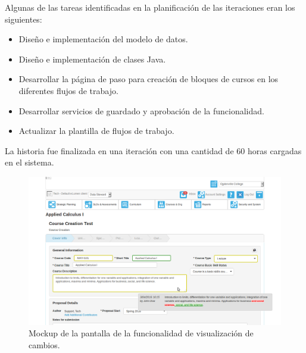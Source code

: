 Algunas de las tareas identificadas en la planificación de las iteraciones eran los siguientes:
\begin{itemize}
	\item Diseño e implementación del modelo de datos.
	\item Diseño e implementación de clases Java.
	\item Desarrollar la página de paso para creación de bloques de cursos en los diferentes flujos de trabajo.
	\item Desarrollar servicios de guardado y aprobación de la funcionalidad.
	\item Actualizar la plantilla de flujos de trabajo.
\end{itemize}

La historia fue finalizada en una iteración con una cantidad de 60 horas cargadas en el sistema.

\begin{figure}[H]
\centering
\includegraphics[width=125mm,scale=1]{Capitulos/DesarrollodelaAplicacion/Imagenes/visualize_changes}
\caption{Mockup de la pantalla de la funcionalidad de visualización de cambios.}
  \label{visualize_changes}
\end{figure}
